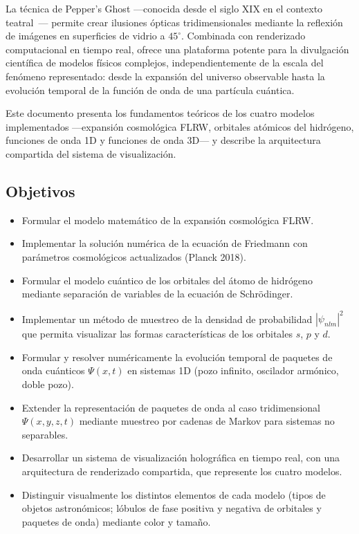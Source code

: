 \documentclass[12pt, a4paper]{article}
\begin{document}
La técnica de Pepper's Ghost —conocida desde el siglo XIX en el
contexto teatral~\cite{pepper1890}— permite crear ilusiones ópticas
tridimensionales mediante la reflexión de imágenes en superficies de
vidrio a $45^\circ$. Combinada con renderizado computacional en tiempo
real, ofrece una plataforma potente para la divulgación científica de
modelos físicos complejos, independientemente de la escala del
fenómeno representado: desde la expansión del universo observable
hasta la evolución temporal de la función de onda de una partícula
cuántica.

Este documento presenta los fundamentos teóricos de los cuatro modelos
implementados —expansión cosmológica FLRW, orbitales atómicos del
hidrógeno, funciones de onda 1D y funciones de onda 3D— y describe la
arquitectura compartida del sistema de visualización.

\subsection{Objetivos}

\begin{itemize}
  \item Formular el modelo matemático de la expansión cosmológica FLRW.
  \item Implementar la solución numérica de la ecuación de Friedmann
        con parámetros cosmológicos actualizados (Planck 2018).
  \item Formular el modelo cuántico de los orbitales del átomo de
        hidrógeno mediante separación de variables de la ecuación de
        Schrödinger.
  \item Implementar un método de muestreo de la densidad de
        probabilidad $|\psi_{nlm}|^2$ que permita visualizar las
        formas características de los orbitales $s$, $p$ y $d$.
  \item Formular y resolver numéricamente la evolución temporal de
        paquetes de onda cuánticos $\Psi(x,t)$ en sistemas 1D
        (pozo infinito, oscilador armónico, doble pozo).
  \item Extender la representación de paquetes de onda al caso
        tridimensional $\Psi(x,y,z,t)$ mediante muestreo por cadenas
        de Markov para sistemas no separables.
  \item Desarrollar un sistema de visualización holográfica en tiempo
        real, con una arquitectura de renderizado compartida, que
        represente los cuatro modelos.
  \item Distinguir visualmente los distintos elementos de cada modelo
        (tipos de objetos astronómicos; lóbulos de fase positiva y
        negativa de orbitales y paquetes de onda) mediante color y
        tamaño.
\end{itemize}
\end{document}
